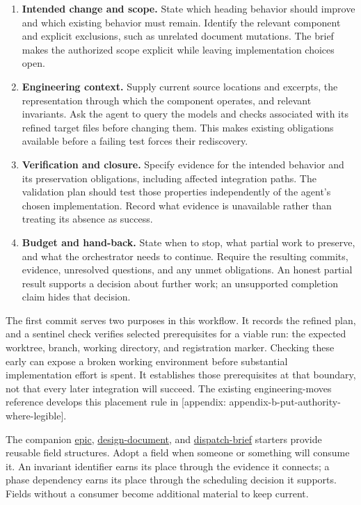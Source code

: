 \begin{enumerate}
\tightlist
\item
  \textbf{Intended change and scope.} State which heading behavior should improve and which existing behavior must remain. Identify the relevant component and explicit exclusions, such as unrelated document mutations. The brief makes the authorized scope explicit while leaving implementation choices open.
\item
  \textbf{Engineering context.} Supply current source locations and excerpts, the representation through which the component operates, and relevant invariants. Ask the agent to query the models and checks associated with its refined target files before changing them. This makes existing obligations available before a failing test forces their rediscovery.
\item
  \textbf{Verification and closure.} Specify evidence for the intended behavior and its preservation obligations, including affected integration paths. The validation plan should test those properties independently of the agent's chosen implementation. Record what evidence is unavailable rather than treating its absence as success.
\item
  \textbf{Budget and hand-back.} State when to stop, what partial work to preserve, and what the orchestrator needs to continue. Require the resulting commits, evidence, unresolved questions, and any unmet obligations. An honest partial result supports a decision about further work; an unsupported completion claim hides that decision.
\end{enumerate}

The first commit serves two purposes in this workflow. It records the refined plan, and a sentinel check verifies selected prerequisites for a viable run: the expected worktree, branch, working directory, and registration marker. Checking these early can expose a broken working environment before substantial implementation effort is spent. It establishes those prerequisites at that boundary, not that every later integration will succeed. The existing engineering-moves reference develops this placement rule in {[}appendix: appendix-b-put-authority-where-legible{]}.

The companion \href{https://davisjam.github.io/model-based-agentic-software-engineering/downloads/EPIC-TEMPLATE-starter.md}{epic}, \href{https://davisjam.github.io/model-based-agentic-software-engineering/downloads/design-doc-template-starter.md}{design-document}, and \href{https://davisjam.github.io/model-based-agentic-software-engineering/downloads/agent-brief-starter.md}{dispatch-brief} starters provide reusable field structures. Adopt a field when someone or something will consume it. An invariant identifier earns its place through the evidence it connects; a phase dependency earns its place through the scheduling decision it supports. Fields without a consumer become additional material to keep current.


